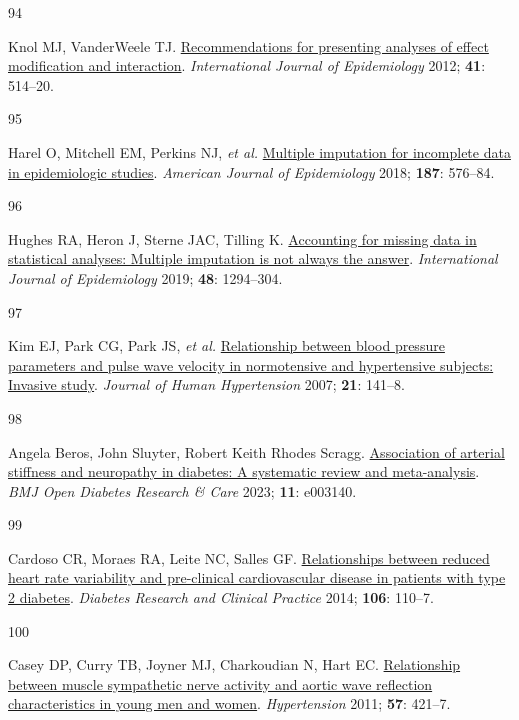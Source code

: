 \documentclass[
  a4paper,
  headsepline=true,
  open=left]{scrbook}
\newlength{\cslhangindent}
\newlength{\csllabelwidth}
\newlength{\cslentryspacingunit} %
\newenvironment{CSLReferences}[2] %
 {%
  \setlength{\parindent}{0pt}
  \ifodd #1
  \let\oldpar\par
  \def\par{\hangindent=\cslhangindent\oldpar}
  \fi
  \setlength{\parskip}{#2\cslentryspacingunit}
 }%
 {}
\newcommand{\CSLLeftMargin}[1]{\parbox[t]{\csllabelwidth}{#1}}
\newcommand{\CSLRightInline}[1]{\parbox[t]{\linewidth - \csllabelwidth}{#1}\break}
\begin{document}
\begin{CSLReferences}{0}{0}
\leavevmode{}%
\CSLLeftMargin{94 }%
\CSLRightInline{Knol MJ, VanderWeele TJ.
\href{https://doi.org/10.1093/ije/dyr218}{Recommendations for presenting
analyses of effect modification and interaction}. \emph{International
Journal of Epidemiology} 2012; \textbf{41}: 514--20.}

\leavevmode{}%
\CSLLeftMargin{95 }%
\CSLRightInline{Harel O, Mitchell EM, Perkins NJ, \emph{et al.}
\href{https://doi.org/10.1093/aje/kwx349}{Multiple imputation for
incomplete data in epidemiologic studies}. \emph{American Journal of
Epidemiology} 2018; \textbf{187}: 576--84.}

\leavevmode{}%
\CSLLeftMargin{96 }%
\CSLRightInline{Hughes RA, Heron J, Sterne JAC, Tilling K.
\href{https://doi.org/10.1093/ije/dyz032}{Accounting for missing data in
statistical analyses: Multiple imputation is not always the answer}.
\emph{International Journal of Epidemiology} 2019; \textbf{48}:
1294--304.}

\leavevmode{}%
\CSLLeftMargin{97 }%
\CSLRightInline{Kim EJ, Park CG, Park JS, \emph{et al.}
\href{https://doi.org/10.1038/sj.jhh.1002120}{Relationship between blood
pressure parameters and pulse wave velocity in normotensive and
hypertensive subjects: Invasive study}. \emph{Journal of Human
Hypertension} 2007; \textbf{21}: 141--8.}

\leavevmode{}%
\CSLLeftMargin{98 }%
\CSLRightInline{Angela Beros, John Sluyter, Robert Keith Rhodes Scragg.
\href{https://doi.org/10.1136/bmjdrc-2022-003140}{Association of
arterial stiffness and neuropathy in diabetes: A systematic review and
meta-analysis}. \emph{BMJ Open Diabetes Research \& Care} 2023;
\textbf{11}: e003140.}

\leavevmode{}%
\CSLLeftMargin{99 }%
\CSLRightInline{Cardoso CR, Moraes RA, Leite NC, Salles GF.
\href{https://doi.org/10.1016/j.diabres.2014.07.005}{Relationships
between reduced heart rate variability and pre-clinical cardiovascular
disease in patients with type 2 diabetes}. \emph{Diabetes Research and
Clinical Practice} 2014; \textbf{106}: 110--7.}

\leavevmode{}%
\CSLLeftMargin{100 }%
\CSLRightInline{Casey DP, Curry TB, Joyner MJ, Charkoudian N, Hart EC.
\href{https://doi.org/10.1161/HYPERTENSIONAHA.110.164517}{Relationship
between muscle sympathetic nerve activity and aortic wave reflection
characteristics in young men and women}. \emph{Hypertension} 2011;
\textbf{57}: 421--7.}


\end{CSLReferences}
\end{document}
